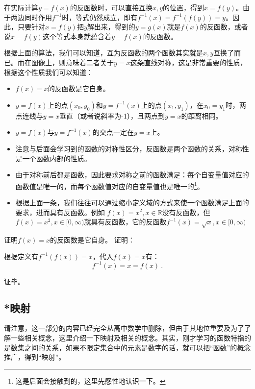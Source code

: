 在实际计算$y=f(x)$的反函数时，可以直接互换$x,y$的位置，得到$x=f(y)$。由于两边同时作用$f^{-1}$时，等式仍然成立，即有$f^{-1}(x)=f^{-1}(f(y))=y$。因此，只要针对$x=f(y)$把$y$解出来，得到的$y=g(x)$就是$f(x)$的反函数，或者说$x=f(y)$这个等式本身就蕴含着$y=f(x)$的反函数。

根据上面的算法，我们可以知道，互为反函数的两个函数其实就是$x,y$互换了而已。而在图像上，则意味着二者关于$y=x$这条直线对称，这是非常重要的性质，根据这个性质我们可以知道：
\begin{itemize}
\item $f(x)=x$的反函数是它自身。
\item $y=f(x)$上的点$(x_0,y_0)$和$y=f^{-1}(x)$上的点$(x_1,y_1)$，在$x_0=y_1$时，两点连线与$y=x$垂直（或者说斜率为-1），且两点到$y=x$的距离相同。
\item $y=f(x)$与$y=f^{-1}(x)$的交点一定在$y=x$上。
\item 注意与后面会学习到的函数的对称性区分，反函数是两个函数的关系，对称性是一个函数内部的性质。
\item 由于对称前后都是函数，因此要求对称之前的函数满足：每个自变量值对应的函数值是唯一的，而每个函数值对应的自变量值也是唯一的\footnote{这是后面会接触到的，这里先感性地认识一下。}。
\item 根据上面一条，我们往往可以通过缩小定义域的方式来使一个函数满足上面的要求，进而具有反函数。例如 $f(x)=x^2,x\in\mathbb{R}$没有反函数，但$f(x)=x^2,x\in[0,\infty)$就具有反函数，它的反函数$f^{-1}(x)=\sqrt{x},x\in[0,\infty)$
\end{itemize}

\begin{exercise}{证明$f(x)=x$的反函数是它自身。}
证明：

根据定义有$f^{-1}(f(x))=x$，代入$f(x)=x$有：
$$
f^{-1}(x)=x=f(x)~.
$$

证毕。
\end{exercise}



\subsection{*映射}

请注意，这一部分的内容已经完全从高中数学中删除，但由于其地位重要及为了了解一些相关概念，这里介绍一下映射及相关的概念。其实，刚才学习的函数特指的是数集之间的关系，如果不限定集合中的元素是数字的话，就可以把“函数”的概念推广，得到“映射”。

